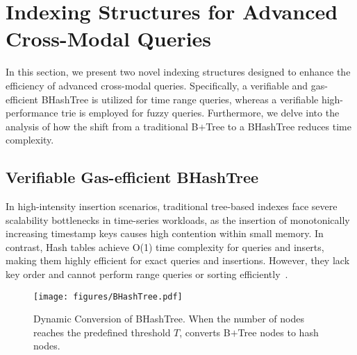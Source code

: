 \section{Indexing Structures for Advanced Cross-Modal Queries}
\label{sect:Structures}

In this section, we present two novel indexing structures designed to enhance the efficiency of advanced cross-modal queries.
Specifically, a verifiable and gas-efficient BHashTree is utilized for time range queries, whereas a verifiable high-performance trie is employed for fuzzy queries. 
Furthermore, we delve into the analysis of how the shift from a traditional B\(+\)Tree to a BHashTree reduces time complexity.


\subsection{Verifiable Gas-efficient BHashTree}
\label{sect:BHashTree}

In high-intensity insertion scenarios, traditional tree-based indexes face severe scalability bottlenecks in time-series workloads, as the insertion of monotonically increasing timestamp keys causes high contention within small memory. 
In contrast, Hash tables achieve O(1) time complexity for queries and inserts, making them highly efficient for exact queries and insertions. 
However, they lack key order and cannot perform range queries or sorting efficiently~\cite{cha2023blink}. 


\begin{figure}[htbp]
    \centering
    \texttt{[image: figures/BHashTree.pdf]}
    \caption{Dynamic Conversion of BHashTree. When the number of nodes reaches the predefined threshold $T$, \Chain converts B\(+\)Tree nodes to hash nodes.}
    \label{fig:Conversion}
\end{figure}


